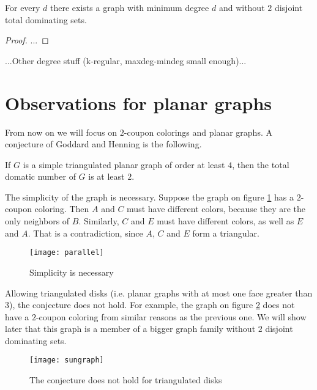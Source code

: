 \begin{thm}
  For every $d$ there exists a graph with minimum degree $d$ and without $2$
  disjoint total dominating sets.
\end{thm}
\begin{proof}
  ...
\end{proof}

...Other degree stuff (k-regular, maxdeg-mindeg small enough)...

\section{Observations for planar graphs}

From now on we will focus on $2$-coupon colorings and planar graphs. A
conjecture of Goddard and Henning is the following.

\begin{conj}
  If $G$ is a simple triangulated planar graph of order at least $4$, then the
  total domatic number of $G$ is at least $2$.
\end{conj}

\begin{remark}
  The simplicity of the graph is necessary. Suppose the graph on figure
  \ref{fig:parallel} has a $2$-coupon coloring. Then $A$ and $C$ must have
  different colors, because they are the only neighbors of $B$. Similarly, $C$
  and $E$ must have different colors, as well as $E$ and $A$. That is a
  contradiction, since $A$, $C$ and $E$ form a triangular.
\end{remark}

\begin{figure}[h]
  \centering
  \texttt{[image: parallel]}
  \caption{Simplicity is necessary}
  \label{fig:parallel}
\end{figure}

\begin{remark}
  Allowing triangulated disks (i.e. planar graphs with at most one face greater
  than $3$), the conjecture does not hold. For example, the graph on figure
  \ref{fig:sungraph} does not have a $2$-coupon coloring from similar reasons as
  the previous one. We will show later that this graph is a member of a bigger
  graph family without $2$ disjoint dominating sets.
\end{remark}

\begin{figure}[ht]
  \centering
  \texttt{[image: sungraph]}
  \caption{The conjecture does not hold for triangulated disks}
  \label{fig:sungraph}
\end{figure}

